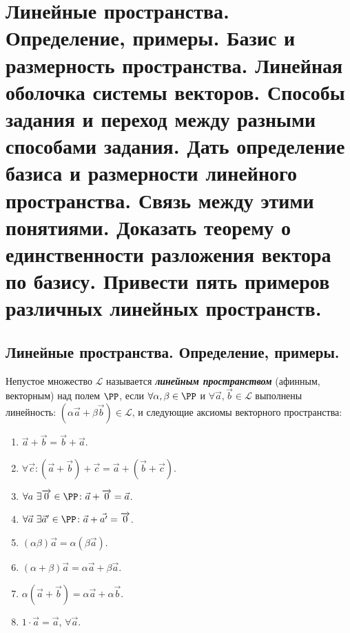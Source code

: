 \section{
    Линейные пространства. Определение, примеры. Базис и размерность пространства. Линейная оболочка системы векторов. Способы задания и переход между разными способами задания. Дать определение базиса и размерности линейного пространства. Связь между этими понятиями. Доказать теорему о единственности разложения вектора по базису. Привести пять примеров различных линейных пространств.
}

\subsection{
    Линейные пространства. Определение, примеры.
}

\begin{definition}
    Непустое множество $\mathcal{L}$ называется \textbf{\textit{линейным пространством}} (афинным, векторным) над полем $\PP$, если $\forall \alpha, \beta \in \PP$ и $\forall \vec{a}, \vec{b} \in \mathcal{L}$ выполнены  линейность:  $(\alpha \vec{a} + \beta \vec{b}) \in \mathcal{L}$, и следующие аксиомы векторного пространства:

    \begin{enumerate}[nosep]
        \item $\vec{a} + \vec{b} = \vec{b} + \vec{a}$.
        \item $\forall \vec{c} \colon (\vec{a} + \vec{b}) + \vec{c} = \vec{a} + (\vec{b} + \vec{c})$.
        \item $\forall a \thinspace \thinspace \exists \overrightarrow{0} \in \PP \colon \vec{a} + \overrightarrow{0} = \vec{a}$.
        \item $\forall \vec{a} \thinspace \thinspace \exists \vec{a}' \in \PP \colon \vec{a} + \vec{a'} = \overrightarrow{0}$.
        \item $(\alpha \beta) \vec{a} = \alpha(\beta \vec{a})$.
        \item $(\alpha + \beta)\vec{a} = \alpha \vec{a} + \beta \vec{a}$.
        \item $\alpha(\vec{a} + \vec{b}) = \alpha \vec{a} + \alpha \vec{b}$.
        \item $1 \cdot \vec{a} = \vec{a}$, $\forall \vec{a}$.
    \end{enumerate}
\end{definition}

